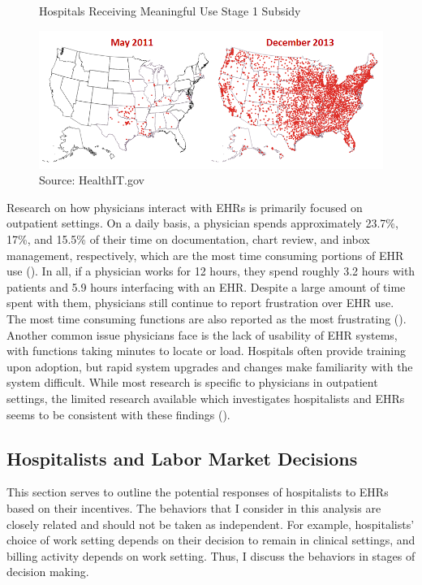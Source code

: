 \documentclass[12pt]{article}
\begin{document}
\begin{figure}[ht]
    \centering
    \captionsetup{width=.6\linewidth}
    \caption{Hospitals Receiving Meaningful Use Stage 1 Subsidy}
    \includegraphics[scale=.5]{graphics/QS-Hospitals-Receiving-Payments-for-MU-and-Adoption.png}
    \caption*{Source: HealthIT.gov}
    \label{fig:meanuse}
\end{figure}

Research on how physicians interact with EHRs is primarily focused on outpatient settings. On a daily basis, a physician spends approximately 23.7\%, 17\%, and 15.5\% of their time on documentation, chart review, and inbox management, respectively, which are the most time consuming portions of EHR use (\cite{arndt2017tethered}). In all, if a physician works for 12 hours, they spend roughly 3.2 hours with patients and 5.9 hours interfacing with an EHR. Despite a large amount of time spent with them, physicians still continue to report frustration over EHR use. The most time consuming functions are also reported as the most frustrating (\cite{dymek2021building}). Another common issue physicians face is the lack of usability of EHR systems, with functions taking minutes to locate or load. Hospitals often provide training upon adoption, but rapid system upgrades and changes make familiarity with the system difficult. While most research is specific to physicians in outpatient settings, the limited research available which investigates hospitalists and EHRs seems to be consistent with these findings (\cite{tipping2010did}). 

\subsection{Hospitalists and Labor Market Decisions}

This section serves to outline the potential responses of hospitalists to EHRs based on their incentives. The behaviors that I consider in this analysis are closely related and should not be taken as independent. For example, hospitalists' choice of work setting depends on their decision to remain in clinical settings, and billing activity depends on work setting. Thus, I discuss the behaviors in stages of decision making. 
\end{document}
